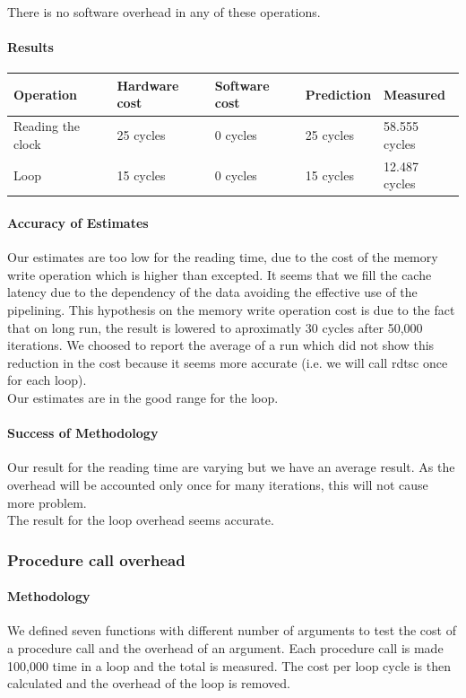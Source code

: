 There is no software overhead in any of these operations.

\paragraph{Results}

\begin{tabular}{| l | l | l | l | l |}
\hline
Operation & Hardware cost & Software cost & Prediction & Measured \\
\hline
Reading the clock & 25 cycles & 0 cycles & 25 cycles & 58.555 cycles \\
\hline
Loop & 15 cycles & 0 cycles & 15 cycles & 12.487 cycles \\
\hline
\end{tabular}
\paragraph{Accuracy of Estimates}
Our estimates are too low for the reading time, due to the cost of the memory write operation which is
higher than excepted.
It seems that we fill the cache latency due to the dependency of the data
avoiding the effective use of the pipelining.
This hypothesis on the memory write operation cost is due to the fact that on long run,
the result is lowered to aproximatly 30 cycles after 50,000 iterations.
We choosed to report the average of a run which did not show this reduction in
the cost because it seems more accurate (i.e. we will call rdtsc once for each
loop).\\

Our estimates are in the good range for the loop.

\paragraph{Success of Methodology}
Our result for the reading time are varying but we have an average result. As
the overhead will be accounted only once for many iterations, this will not
cause more problem.\\

The result for the loop overhead seems accurate.

\subsubsection{Procedure call overhead}
\paragraph{Methodology}
We defined seven functions with different number of arguments to test the
cost of a procedure call and the overhead of an argument.
Each procedure call is made 100,000 time in a loop and the total is measured.
The cost per loop cycle is then calculated and the overhead of the loop is
removed.

